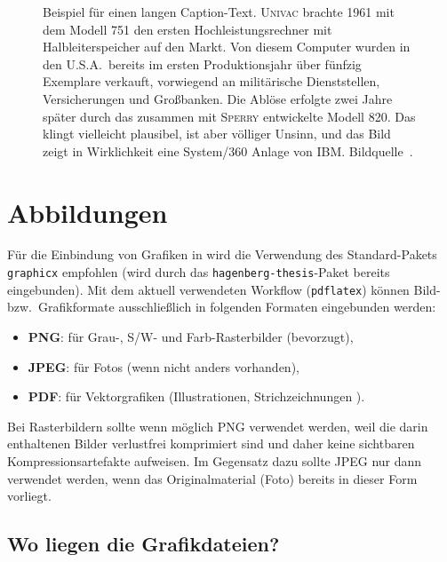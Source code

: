 \begin{figure}
	\centering
	\caption{Beispiel für einen langen Caption-Text. \textsc{Univac} brachte
	1961 mit dem Modell 751 den ersten Hochleistungsrechner mit
	Halbleiterspeicher auf den Markt. Von diesem Computer wurden in den U.S.A.\
	bereits im ersten Produktionsjahr über fünfzig Exemplare verkauft,
	vorwiegend an militärische Dienststellen, Versicherungen und
	Großbanken. Die Ablöse erfolgte zwei Jahre später durch das zusammen
	mit \textsc{Sperry} entwickelte Modell 820. Das klingt vielleicht
	plausibel, ist aber völliger Unsinn, und das Bild zeigt in Wirklichkeit
	eine System/360 Anlage von IBM. Bildquelle~\cite{IBM360}.}
	\label{fig:ibm360}
\end{figure}


\section{Abbildungen}

Für die Einbindung von Grafiken in \latex wird die Verwendung des
Stan\-dard-Pakets \texttt{graphicx} \cite{Carlisle2021} empfohlen (wird durch
das \texttt{hagenberg-thesis}-Paket bereits eingebunden). Mit dem aktuell
verwendeten Workflow (\texttt{pdflatex}) können Bild- bzw.\ Grafikformate
ausschließlich in folgenden Formaten eingebunden werden:
%
\begin{itemize}
	\item \textbf{PNG}: für Grau-, S/W- und Farb-Rasterbilder (bevorzugt),
	\item \textbf{JPEG}: für Fotos (wenn nicht anders vorhanden),
	\item \textbf{PDF}: für Vektorgrafiken (Illustrationen, Strichzeichnungen \etc).
\end{itemize}
%
Bei Rasterbildern sollte wenn möglich PNG verwendet werden, weil die darin
enthaltenen Bilder verlustfrei komprimiert sind und daher keine sichtbaren
Kompressionsartefakte aufweisen. Im Gegensatz dazu sollte JPEG nur dann
verwendet werden, wenn das Originalmaterial (Foto) bereits in dieser Form
vorliegt.


\subsection{Wo liegen die Grafikdateien?}

